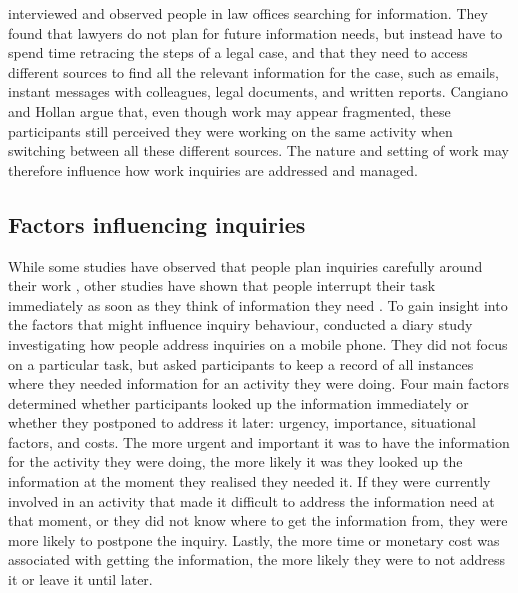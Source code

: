 \citet{Cangiano2009} interviewed and observed people in law offices searching for information. They found that lawyers do not plan for future information needs, but instead have to spend time retracing the steps of a legal case, and that they need to access different sources to find all the relevant information for the case, such as emails, instant messages with colleagues, legal documents, and written reports. Cangiano and Hollan argue that, even though work may appear fragmented, these participants still perceived they were working on the same activity when switching between all these different sources. The nature and setting of work may therefore influence how work inquiries are addressed and managed.

\subsection{Factors influencing inquiries}
While some studies have observed that people plan inquiries carefully around their work \citep{Reddy2002}, other studies have shown that people interrupt their task immediately as soon as they think of information they need \citep{Jin2009}.
To gain insight into the factors that might influence inquiry behaviour, \citet{Sohn2008} conducted a diary study investigating how people address inquiries on a mobile phone. They did not focus on a particular task, but asked participants to keep a record of all instances where they needed information for an activity they were doing.  Four main factors determined whether participants looked up the information immediately or whether they postponed to address it later: urgency, importance, situational factors, and costs. The more urgent and important it was to have the information for the activity they were doing, the more likely it was they looked up the information at the moment they realised they needed it. If they were currently involved in an activity that made it difficult to address the information need at that moment, or they did not know where to get the information from, they were more likely to postpone the inquiry. Lastly, the more time or monetary cost was associated with getting the information, the more likely they were to not address it or leave it until later. 

